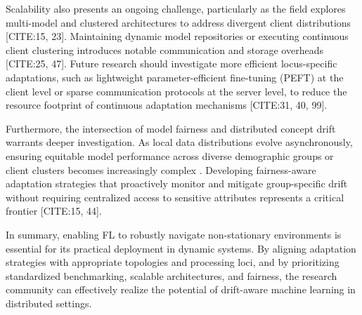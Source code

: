 \documentclass[journal]{IEEEtran}
\begin{document}
Scalability also presents an ongoing challenge, particularly as the field explores multi-model and clustered architectures to address divergent client distributions [CITE:15, 23]. Maintaining dynamic model repositories or executing continuous client clustering introduces notable communication and storage overheads [CITE:25, 47]. Future research should investigate more efficient locus-specific adaptations, such as lightweight parameter-efficient fine-tuning (PEFT) at the client level or sparse communication protocols at the server level, to reduce the resource footprint of continuous adaptation mechanisms [CITE:31, 40, 99].

Furthermore, the intersection of model fairness and distributed concept drift warrants deeper investigation. As local data distributions evolve asynchronously, ensuring equitable model performance across diverse demographic groups or client clusters becomes increasingly complex \cite{Badar2023}. Developing fairness-aware adaptation strategies that proactively monitor and mitigate group-specific drift without requiring centralized access to sensitive attributes represents a critical frontier [CITE:15, 44].

In summary, enabling FL to robustly navigate non-stationary environments is essential for its practical deployment in dynamic systems. By aligning adaptation strategies with appropriate topologies and processing loci, and by prioritizing standardized benchmarking, scalable architectures, and fairness, the research community can effectively realize the potential of drift-aware machine learning in distributed settings.



\end{document}
